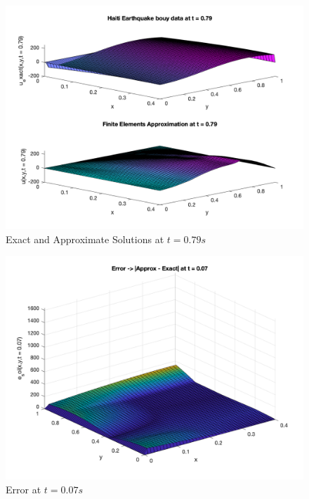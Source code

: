 \documentclass[conf]{new-aiaa}
\begin{document}
\begin{figure}[H]
    \begin{center}
    \includegraphics [width= 1\linewidth]{figures/ExactandApprox_t079.png}
    \caption{Exact and Approximate Solutions at $t=0.79s$}
    \label{fig_t079}
    \end{center}
\end{figure}

\begin{figure}[H]
    \begin{center}
    \includegraphics [width= .8\linewidth]{figures/Error_t007.png}
    \caption{Error at $t=0.07s$}
    \label{fig_errt007}
    \end{center}
\end{figure}
\end{document}
